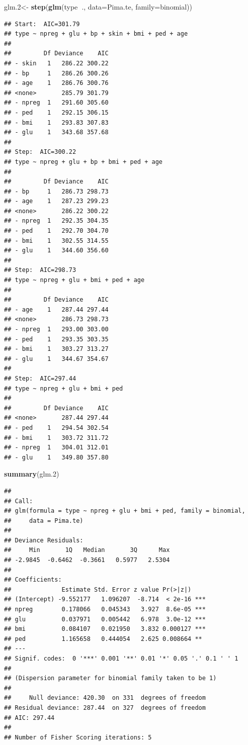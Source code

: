\documentclass[]{book}
\newenvironment{Shaded}{\begin{snugshade}}{\end{snugshade}}
\newcommand{\KeywordTok}[1]{\textcolor[rgb]{0.13,0.29,0.53}{\textbf{#1}}}
\newcommand{\DataTypeTok}[1]{\textcolor[rgb]{0.13,0.29,0.53}{#1}}
\newcommand{\DecValTok}[1]{\textcolor[rgb]{0.00,0.00,0.81}{#1}}
\newcommand{\StringTok}[1]{\textcolor[rgb]{0.31,0.60,0.02}{#1}}
\newcommand{\OperatorTok}[1]{\textcolor[rgb]{0.81,0.36,0.00}{\textbf{#1}}}
\newcommand{\NormalTok}[1]{#1}
\theoremstyle{definition}
\theoremstyle{definition}
\theoremstyle{definition}
\theoremstyle{remark}
\begin{document}
\begin{Shaded}
\begin{Highlighting}[]
\NormalTok{glm.}\DecValTok{2}\NormalTok{<-}\StringTok{ }\KeywordTok{step}\NormalTok{(}\KeywordTok{glm}\NormalTok{(type}\OperatorTok{~}\NormalTok{., }\DataTypeTok{data=}\NormalTok{Pima.te, }\DataTypeTok{family=}\NormalTok{binomial))}
\end{Highlighting}
\end{Shaded}

\begin{verbatim}
## Start:  AIC=301.79
## type ~ npreg + glu + bp + skin + bmi + ped + age
## 
##         Df Deviance    AIC
## - skin   1   286.22 300.22
## - bp     1   286.26 300.26
## - age    1   286.76 300.76
## <none>       285.79 301.79
## - npreg  1   291.60 305.60
## - ped    1   292.15 306.15
## - bmi    1   293.83 307.83
## - glu    1   343.68 357.68
## 
## Step:  AIC=300.22
## type ~ npreg + glu + bp + bmi + ped + age
## 
##         Df Deviance    AIC
## - bp     1   286.73 298.73
## - age    1   287.23 299.23
## <none>       286.22 300.22
## - npreg  1   292.35 304.35
## - ped    1   292.70 304.70
## - bmi    1   302.55 314.55
## - glu    1   344.60 356.60
## 
## Step:  AIC=298.73
## type ~ npreg + glu + bmi + ped + age
## 
##         Df Deviance    AIC
## - age    1   287.44 297.44
## <none>       286.73 298.73
## - npreg  1   293.00 303.00
## - ped    1   293.35 303.35
## - bmi    1   303.27 313.27
## - glu    1   344.67 354.67
## 
## Step:  AIC=297.44
## type ~ npreg + glu + bmi + ped
## 
##         Df Deviance    AIC
## <none>       287.44 297.44
## - ped    1   294.54 302.54
## - bmi    1   303.72 311.72
## - npreg  1   304.01 312.01
## - glu    1   349.80 357.80
\end{verbatim}

\begin{Shaded}
\begin{Highlighting}[]
\KeywordTok{summary}\NormalTok{(glm.}\DecValTok{2}\NormalTok{)}
\end{Highlighting}
\end{Shaded}

\begin{verbatim}
## 
## Call:
## glm(formula = type ~ npreg + glu + bmi + ped, family = binomial, 
##     data = Pima.te)
## 
## Deviance Residuals: 
##     Min       1Q   Median       3Q      Max  
## -2.9845  -0.6462  -0.3661   0.5977   2.5304  
## 
## Coefficients:
##              Estimate Std. Error z value Pr(>|z|)    
## (Intercept) -9.552177   1.096207  -8.714  < 2e-16 ***
## npreg        0.178066   0.045343   3.927  8.6e-05 ***
## glu          0.037971   0.005442   6.978  3.0e-12 ***
## bmi          0.084107   0.021950   3.832 0.000127 ***
## ped          1.165658   0.444054   2.625 0.008664 ** 
## ---
## Signif. codes:  0 '***' 0.001 '**' 0.01 '*' 0.05 '.' 0.1 ' ' 1
## 
## (Dispersion parameter for binomial family taken to be 1)
## 
##     Null deviance: 420.30  on 331  degrees of freedom
## Residual deviance: 287.44  on 327  degrees of freedom
## AIC: 297.44
## 
## Number of Fisher Scoring iterations: 5
\end{verbatim}
\end{document}
